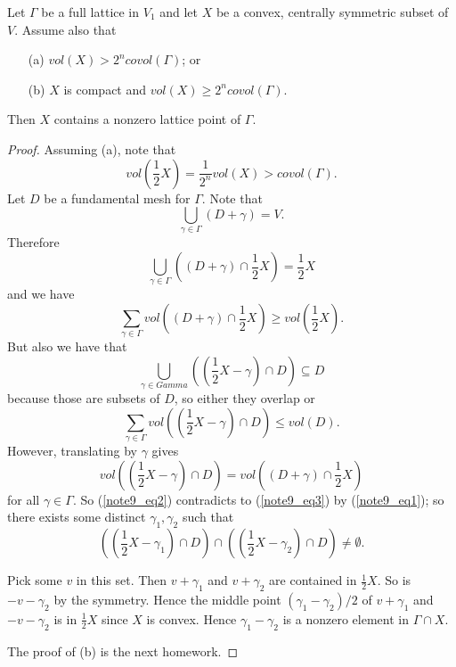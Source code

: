 \begin{theorem}[Minkowski]
    Let $\Gamma$ be a full lattice in $V_1$ and let $X$ be a convex, centrally symmetric subset of $V$. Assume also that
    \begin{itemize}
        \item[(a)] $vol(X) > 2^n covol(\Gamma)$; or
        \item[(b)] $X$ is compact and $vol(X) \geq 2^n covol(\Gamma)$.
    \end{itemize}
    Then $X$ contains a nonzero lattice point of $\Gamma$.
\end{theorem}
\begin{proof}
    Assuming (a), note that
    \begin{equation}
        vol(\frac{1}{2}X) = \frac{1}{2^n}vol(X) > covol(\Gamma).
        \label{note9_eq1}
    \end{equation}
    Let $D$ be a fundamental mesh for $\Gamma$. Note that
    \[\underset{\gamma \in \Gamma}{\bigcup}(D+\gamma) = V.\]
    Therefore 
    \[\underset{\gamma \in \Gamma}{\bigcup}((D+\gamma)\cap \frac{1}{2}X) = \frac{1}{2}X\]
    and we have
    \begin{equation}
        \sum_{\gamma \in \Gamma}vol((D+\gamma)\cap \frac{1}{2}X) \geq vol(\frac{1}{2}X).
        \label{note9_eq2}
    \end{equation}
    But also we have that
    \[\underset{\gamma \in Gamma}{\bigcup}((\frac{1}{2}X-\gamma)\cap D) \subseteq D\]
    because those are subsets of $D$, so either they overlap or
    \begin{equation}
        \sum_{\gamma \in \Gamma}vol((\frac{1}{2}X-\gamma)\cap D) \leq vol(D).
        \label{note9_eq3}
    \end{equation}
    However, translating by $\gamma$ gives
    \[vol((\frac{1}{2}X-\gamma) \cap D) = vol ((D+\gamma)\cap \frac{1}{2}X)\]
    for all $\gamma \in \Gamma$. So (\ref{note9_eq2}) contradicts to (\ref{note9_eq3}) by (\ref{note9_eq1}); so there exists some distinct $\gamma_1, \gamma_2$ such that
    \[((\frac{1}{2}X-\gamma_1) \cap D)\cap ((\frac{1}{2}X-\gamma_2) \cap D) \neq \emptyset.\]

    Pick some $v$ in this set. Then $v +\gamma_1$ and $v+\gamma_2$ are contained in $\frac{1}{2}X$. So is $-v-\gamma_2$ by the symmetry. Hence the middle point $(\gamma_1-\gamma_2)/2$ of $v+\gamma_1$ and $-v-\gamma_2$ is in $\frac{1}{2}X$ since $X$ is convex. Hence $\gamma_1-\gamma_2$ is a nonzero element in $\Gamma\cap X$.

    The proof of (b) is the next homework.
\end{proof}


